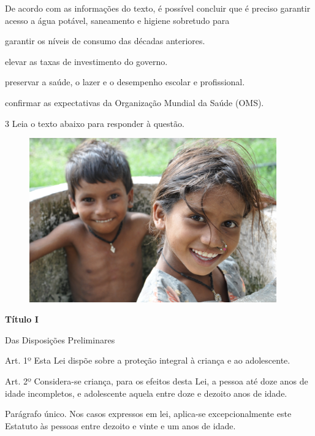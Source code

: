 De acordo com as informações do texto, é possível concluir que é preciso 
garantir acesso a água potável, saneamento e higiene sobretudo para

\begin{escolha}

    \item garantir os níveis de consumo das décadas anteriores. 

    \item elevar as taxas de investimento do governo. 
  
    \item preservar a saúde, o lazer e o desempenho escolar e profissional.
  
    \item confirmar as expectativas da Organização Mundial da Saúde (OMS).

\end{escolha}

\num{3} Leia o texto abaixo para responder à questão. 

\begin{myquote}

\begin{figure}[H]
\centering
\includegraphics[width=0.95\textwidth]{./imgSAEB_7_POR/media/image70.png}
\end{figure} 

\textbf{Título I}

Das Disposições Preliminares

Art. 1º Esta Lei dispõe sobre a proteção integral à criança e ao
adolescente.

Art. 2º Considera-se criança, para os efeitos desta Lei, a pessoa até
doze anos de idade incompletos, e adolescente aquela entre doze e
dezoito anos de idade.

Parágrafo único. Nos casos expressos em lei, aplica-se excepcionalmente
este Estatuto às pessoas entre dezoito e vinte e um anos de idade.


\end{myquote}


